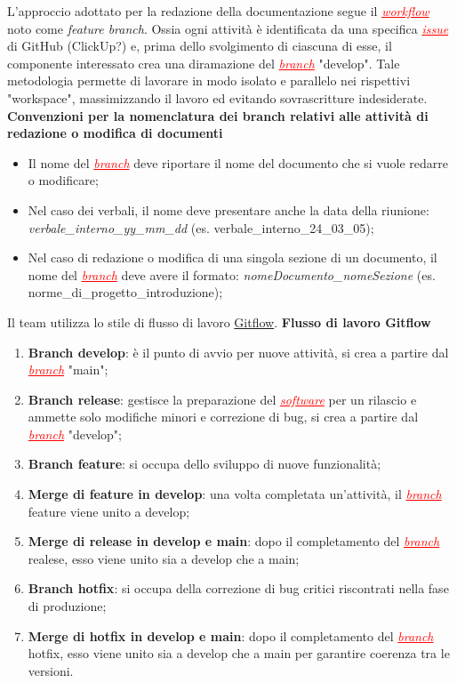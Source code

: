 L'approccio adottato per la redazione della documentazione segue il \textcolor{red}{\uline{\textit{workflow}}} noto come \textit{feature branch}.
Ossia ogni attività è identificata da una specifica \textcolor{red}{\uline{\textit{issue}}} di GitHub (ClickUp?) e, prima dello svolgimento di
ciascuna di esse, il componente interessato crea una diramazione del \textcolor{red}{\uline{\textit{branch}}} "develop". Tale metodologia
permette di lavorare in modo isolato e parallelo nei rispettivi "workspace", massimizzando il lavoro ed evitando sovrascritture indesiderate.
\textbf{Convenzioni per la nomenclatura dei branch relativi alle attività di redazione o modifica di documenti} \label{convenzioni_nomenclatura}
\begin{itemize}
    \item Il nome del \textcolor{red}{\uline{\textit{branch}}} deve riportare il nome del documento che si vuole redarre o modificare;
    \item Nel caso dei verbali, il nome deve presentare anche la data della riunione: \textit{verbale\_interno\_yy\_mm\_dd} (es. verbale\_interno\_24\_03\_05);
    \item Nel caso di redazione o modifica di una singola sezione di un documento, il nome del \textcolor{red}{\uline{\textit{branch}}} deve avere il formato:
    \textit{nomeDocumento\_nomeSezione} (es. norme\_di\_progetto\_introduzione);
\end{itemize}

Il team utilizza lo stile di flusso di lavoro \href{https://www.atlassian.com/it/git/tutorials/comparing-workflows/gitflow-workflow}{Gitflow}.
\textbf{Flusso di lavoro Gitflow}
\begin{enumerate}
    \item \textbf{Branch develop}: è il punto di avvio per nuove attività, si crea a partire dal \textcolor{red}{\uline{\textit{branch}}} "main";
    \item \textbf{Branch release}: gestisce la preparazione del \textcolor{red}{\uline{\textit{software}}} per un rilascio e ammette solo
        modifiche minori e correzione di bug, si crea a partire dal \textcolor{red}{\uline{\textit{branch}}} "develop";
    \item \textbf{Branch feature}: si occupa dello sviluppo di nuove funzionalità;
    \item \textbf{Merge di feature in develop}: una volta completata un'attività, il \textcolor{red}{\uline{\textit{branch}}} feature viene
        unito a develop;
    \item \textbf{Merge di release in develop e main}: dopo il completamento del \textcolor{red}{\uline{\textit{branch}}} realese, esso viene
        unito sia a develop che a main;
    \item \textbf{Branch hotfix}: si occupa della correzione di bug critici riscontrati nella fase di produzione;
    \item \textbf{Merge di hotfix in develop e main}: dopo il completamento del \textcolor{red}{\uline{\textit{branch}}} hotfix, esso viene
        unito sia a develop che a main per garantire coerenza tra le versioni.
\end{enumerate}

